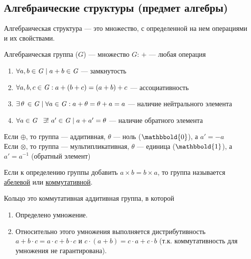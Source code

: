 \subsection{%
  Алгебраические структуры (предмет алгебры)%
}
\begin{definition}
	Алгебраическая структура --- это множество,
	с определенной на нем операциями и их свойствами.
\end{definition}
\begin{definition}
	Алгебраическая группа ($G$) --- множество $G$: \underline{$+$} --- любая операция
	\begin{enumerate}[topsep=5pt]
		\item \(\forall a, b \in \mathit{G} \mid a + b \in \mathit{G}\) --- замкнутость
		\item $\forall a,b,c \in \mathit{G}: a + (b + c) = (a + b) + c$ --- ассоциативность
		\item $\exists \, \theta \, \in \mathit{G} \mid \forall a \in \mathit{G}: a + \theta = \theta + a = a$ --- наличие нейтрального элемента
		\item $\forall a \in \mathit{G} \hspace{0.8em} \exists!\, \, a' \in \mathit{G} \mid a + a' = \theta$ --- наличие обратного элемента
	\end{enumerate}
\end{definition}
\begin{nota}
	Если $\oplus$, то группа --- аддитивная, $\theta$ --- ноль ($\mathbbold{0}$), а $a' = -a$\\[1mm]
	\hspace*{7.6em} Если $\otimes$, то группа --- мультипликативная, $\theta$ --- единица ($\mathbbold{1}$), а $a' = a^{-1}$ (обратный элемент)\\[1mm]
	\noindent{}
\end{nota}
\begin{nota}
	Если к определению группы добавить $a \times b = b \times a$,
	то группа называется \underline{абелевой} или \underline{коммутативной}.
\end{nota}
\begin{definition}
  Кольцо это коммутативная аддитивная группа, в которой

  \begin{enumerate}
  \item
    Определено умножение.

  \item
    Относительно этого умножения выполняется дистрибутивность\\ \(a + b \cdot c =
    a \cdot c + b \cdot c\) и \(c \cdot (a + b) = c \cdot a + c \cdot b\) (т.к.
    коммутативность для умножения не гарантирована).
  \end{enumerate}
\end{definition}

